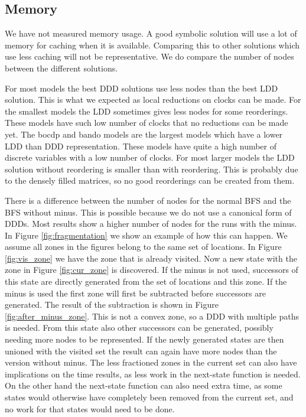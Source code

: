 \subsection{Memory}
We have not measured memory usage. A good symbolic solution will use a lot of memory for caching when it is available. Comparing this to other solutions which use less caching will not be representative. We do compare the number of nodes between the different solutions. 

For most models the best DDD solutions use less nodes than the best LDD solution. This is what we expected as local reductions on clocks can be made. For the smallest models the LDD sometimes gives less nodes for some reorderings. These models have such low number of clocks that no reductions can be made yet. The bocdp and bando models are the largest models which have a lower LDD than DDD representation. These models have quite a high number of discrete variables with a low number of clocks. For most larger models the LDD solution without reordering is smaller than with reordering. This is probably due to the densely filled matrices, so no good reorderings can be created from them.

There is a difference between the number of nodes for the normal BFS and the BFS without minus. This is possible because we do not use a canonical form of DDDs. Most results show a higher number of nodes for the runs with the minus. In Figure \ref{fig:fragmentation} we show an example of how this can happen. We assume all zones in the figures belong to the same set of locations. In Figure \ref{fig:vis_zone} we have the zone that is already visited. Now a new state with the zone in Figure \ref{fig:cur_zone} is discovered. If the minus is not used, successors of this state are directly generated from the set of locations and this zone. If the minus is used the first zone will first be subtracted before successors are generated. The result of the subtraction is shown in Figure \ref{fig:after_minus_zone}. This is not a convex zone, so a DDD with multiple paths is needed. From this state also other successors can be generated, possibly needing more nodes to be represented. If the newly generated states are then unioned with the visited set the result can again have more nodes than the version without minus. The less fractioned zones in the current set can also have implications on the time results, as less work in the next-state function is needed. On the other hand the next-state function can also need extra time, as some states would otherwise have completely been removed from the current set, and no work for that states would need to be done. 

